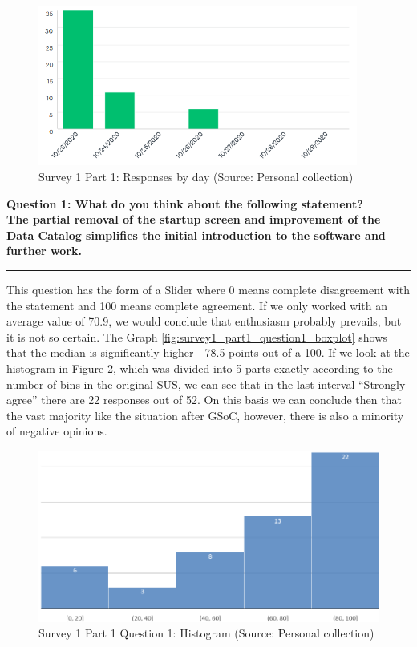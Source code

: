 \documentclass[a4paper,10pt,twoside]{article}
\begin{document}
\begin{figure}[hbt!] 
\begin{center}
\includegraphics[width=10.5cm]{../surveys/analyzed_data/survey1_part1_insight2.png} 
\caption[Survey 1 Part 1: Responses by day]{Survey 1 Part 1: Responses by day (Source: Personal collection)}
\label{fig:survey1_part1_insight2}
\end{center}
\end{figure}

\newpage
\noindent \textbf{Question 1: What do you think about the following statement? \\
The partial removal of the startup screen and improvement of the Data Catalog simplifies the initial introduction to the software and further work.}
\par\noindent\rule{\textwidth}{0.4pt}
\noindent This question has the form of a Slider where 0 means complete disagreement with the statement and 100 means complete agreement. If we only worked with an average value of 70.9, we would conclude that enthusiasm probably prevails, but it is not so certain. The Graph \ref{fig:survey1_part1_question1_boxplot} shows that the median is significantly higher - 78.5 points out of a 100. If we look at the histogram in Figure \ref{fig:survey1_part1_question1_histogram}, which was divided into 5 parts exactly according to the number of bins in the original SUS, we can see that in the last interval ``Strongly agree'' there are 22 responses out of 52. On this basis we can conclude then that the vast majority like the situation after GSoC, however, there is also a minority of negative opinions.

\begin{figure}[hbt!] 
\begin{center}
\includegraphics[width=12cm]{../surveys/analyzed_data/survey1_part1_question1_excel_histogram.png} 
\caption[Survey 1 Part 1 Question 1: Histogram]{Survey 1 Part 1 Question 1: Histogram (Source: Personal collection)}
\label{fig:survey1_part1_question1_histogram}
\end{center}
\end{figure}
\end{document}
